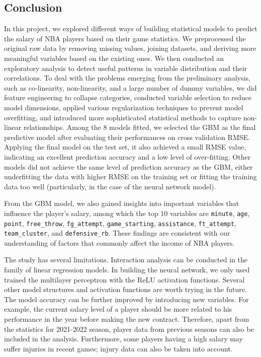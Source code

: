 \documentclass[
]{article}
\begin{document}
\hypertarget{conclusion}{%
\subsection{Conclusion}\label{conclusion}}

In this project, we explored different ways of building statistical
models to predict the salary of NBA players based on their game
statistics. We preprocessed the original raw data by removing missing
values, joining datasets, and deriving more meaningful variables based
on the existing ones. We then conducted an exploratory analysis to
detect useful patterns in variable distribution and their correlations.
To deal with the problems emerging from the preliminary analysis, such
as co-linearity, non-linearity, and a large number of dummy variables,
we did feature engineering to collapse categories, conducted variable
selection to reduce model dimensions, applied various regularization
techniques to prevent model overfitting, and introduced more
sophisticated statistical methods to capture non-linear relationships.
Among the 8 models fitted, we selected the GBM as the final predictive
model after evaluating their performances on cross validation RMSE.
Applying the final model on the test set, it also achieved a small RMSE
value, indicating an excellent prediction accuracy and a low level of
over-fitting. Other models did not achieve the same level of prediction
accuracy as the GBM, either underfitting the data with higher RMSE on
the training set or fitting the training data too well (particularly, in
the case of the neural network model).

From the GBM model, we also gained insights into important variables
that influence the player's salary, among which the top 10 variables are
\texttt{minute}, \texttt{age}, \texttt{point}, \texttt{free\_throw},
\texttt{fg\_attempt}, \texttt{game\_starting}, \texttt{assistance},
\texttt{ft\_attempt}, \texttt{team\_cluster}, and
\texttt{defensive\_rb}. These findings are consistent with our
understanding of factors that commonly affect the income of NBA players.

The study has several limitations. Interaction analysis can be conducted
in the family of linear regression models. In building the neural
network, we only used trained the multilayer perceptron with the ReLU
activation functions. Several other model structures and activation
functions are worth trying in the future. The model accuracy can be
further improved by introducing new variables. For example, the current
salary level of a player should be more related to his performance in
the year before making the new contract. Therefore, apart from the
statistics for 2021-2022 season, player data from previous seasons can
also be included in the analysis. Furthermore, some players having a
high salary may suffer injuries in recent games; injury data can also be
taken into account.
\end{document}
